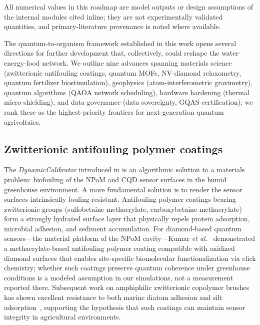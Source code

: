 \documentclass[11pt,a4paper]{article}
\begin{document}
All numerical values in this roadmap are model outputs or design assumptions of the internal modules cited inline; they are not experimentally validated quantities, and primary-literature provenance is noted where available.

The quantum-to-organism framework established in this work opens several directions for further development that, collectively, could reshape the water-energy-food network. We outline nine advances spanning materials science (zwitterionic antifouling coatings, quantum MOFs, NV-diamond relaxometry, quantum fertilizer biostimulation), geophysics (atom-interferometric gravimetry), quantum algorithms (QAOA network scheduling), hardware hardening (thermal micro-shielding), and data governance (data sovereignty, GQAS certification); we rank these as the highest-priority frontiers for next-generation quantum agrivoltaics.

\subsection{Zwitterionic antifouling polymer coatings}
\label{SI-sec:zwitterionic}

The \textit{DynamicCalibrator} introduced in  is an algorithmic solution to a materials problem: biofouling of the NPoM and CQD sensor surfaces in the humid greenhouse environment. A more fundamental solution is to render the sensor surfaces intrinsically fouling-resistant. Antifouling polymer coatings bearing zwitterionic groups (sulfobetaine methacrylate, carboxybetaine methacrylate) form a strongly hydrated surface layer that physically repels protein adsorption, microbial adhesion, and sediment accumulation. For diamond-based quantum sensors---the material platform of the NPoM cavity---Kumar \emph{et al.}~\cite{Kumar2022} demonstrated a methacrylate-based antifouling polymer coating compatible with oxidized diamond surfaces that enables site-specific biomolecular functionalization via click chemistry; whether such coatings preserve quantum coherence under greenhouse conditions is a modeled assumption in our simulations, not a measurement reported there. Subsequent work on amphiphilic zwitterionic copolymer brushes has shown excellent resistance to both marine diatom adhesion and silt adsorption~\cite{Do2025}, supporting the hypothesis that such coatings can maintain sensor integrity in agricultural environments.
\end{document}
